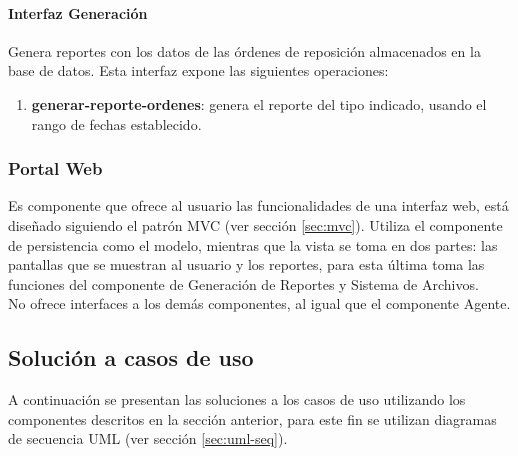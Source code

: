 \paragraph{\indent Interfaz Generación\\} Genera reportes con los datos de las órdenes de reposición almacenados en la base de datos. Esta interfaz expone las siguientes operaciones:
\begin{enumerate}
	\item \textbf{generar-reporte-ordenes}: genera el reporte del tipo indicado, usando el rango de fechas establecido.
\end{enumerate}

\subsubsection{Portal Web}
Es componente que ofrece al usuario las funcionalidades de una interfaz web, está diseñado siguiendo el patrón MVC (ver sección \ref{sec:mvc}). Utiliza el componente de persistencia como el modelo, mientras que la vista se toma en dos partes: las pantallas que se muestran al usuario y los reportes, para esta última toma las funciones del componente de Generación de Reportes y Sistema de Archivos.\\
No ofrece interfaces a los demás componentes, al igual que el componente Agente.



\subsection{Solución a casos de uso}
A continuación se presentan las soluciones a los casos de uso utilizando los componentes descritos en la sección anterior, para este fin se utilizan diagramas de secuencia UML (ver sección \ref{sec:uml-seq}).

